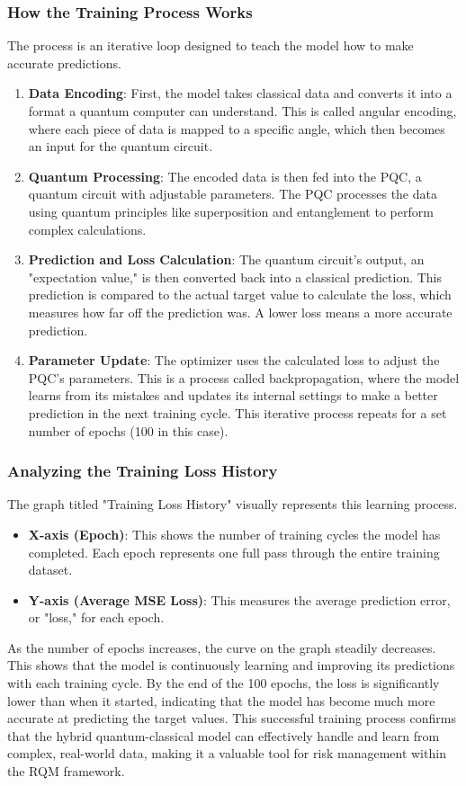 \documentclass{article}
\begin{document}
\subsubsection*{How the Training Process Works}
The process is an iterative loop designed to teach the model how to make accurate predictions.
\begin{enumerate}
\item \textbf{Data Encoding}: First, the model takes classical data and converts it into a format a quantum computer can understand. This is called angular encoding, where each piece of data is mapped to a specific angle, which then becomes an input for the quantum circuit.
\item \textbf{Quantum Processing}: The encoded data is then fed into the PQC, a quantum circuit with adjustable parameters. The PQC processes the data using quantum principles like superposition and entanglement to perform complex calculations.
\item \textbf{Prediction and Loss Calculation}: The quantum circuit's output, an "expectation value," is then converted back into a classical prediction. This prediction is compared to the actual target value to calculate the loss, which measures how far off the prediction was. A lower loss means a more accurate prediction.
\item \textbf{Parameter Update}: The optimizer uses the calculated loss to adjust the PQC's parameters. This is a process called backpropagation, where the model learns from its mistakes and updates its internal settings to make a better prediction in the next training cycle. This iterative process repeats for a set number of epochs (100 in this case).
\end{enumerate}

\subsubsection*{Analyzing the Training Loss History}
The graph titled "Training Loss History" visually represents this learning process.
\begin{itemize}
\item \textbf{X-axis (Epoch)}: This shows the number of training cycles the model has completed. Each epoch represents one full pass through the entire training dataset.
\item \textbf{Y-axis (Average MSE Loss)}: This measures the average prediction error, or "loss," for each epoch.
\end{itemize}
As the number of epochs increases, the curve on the graph steadily decreases. This shows that the model is continuously learning and improving its predictions with each training cycle. By the end of the 100 epochs, the loss is significantly lower than when it started, indicating that the model has become much more accurate at predicting the target values. This successful training process confirms that the hybrid quantum-classical model can effectively handle and learn from complex, real-world data, making it a valuable tool for risk management within the RQM framework.
\end{document}
